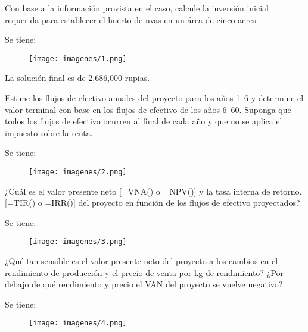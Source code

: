 





\begin{problema}
    Con base a la información provista en el caso, calcule la inversión inicial requerida para establecer el huerto de uvas en un área de cinco acres.
    \begin{sol}
        Se tiene: 
        \begin{figure}[H]
            \centering
            \texttt{[image: imagenes/1.png]}
        \end{figure}
        La solución final es de 2,686,000 rupias. 
    \end{sol}
\end{problema}

\begin{problema}
    Estime los flujos de efectivo anuales del proyecto para los años 1–6 y determine el valor terminal con base en los flujos de efectivo de los años 6–60. Suponga que todos los flujos de efectivo ocurren al final de cada año y que no se aplica el impuesto sobre la renta.
    \begin{sol}
        Se tiene:
        \begin{figure}[H]
            \centering
            \texttt{[image: imagenes/2.png]}
        \end{figure}
    \end{sol}
\end{problema}

\begin{problema}
    ¿Cuál es el valor presente neto [=VNA() o =NPV()] y la tasa interna de retorno. [=TIR() o =IRR()] del proyecto en función de los flujos de efectivo proyectados?
    \begin{sol}
        Se tiene:
        \begin{figure}[H]
            \centering
            \texttt{[image: imagenes/3.png]}
        \end{figure}
    \end{sol}
\end{problema}

\begin{problema}
    ¿Qué tan sensible es el valor presente neto del proyecto a los cambios en el rendimiento de producción y el precio de venta por kg de rendimiento? ¿Por debajo de qué rendimiento y precio el VAN del proyecto se vuelve negativo?
    \begin{sol}
        Se tiene:
        \begin{figure}[H]
            \centering
            \texttt{[image: imagenes/4.png]}
        \end{figure}
    \end{sol}
\end{problema}






%
%

